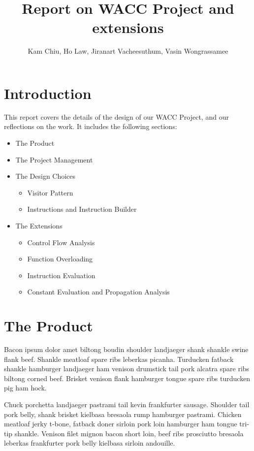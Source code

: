 \documentclass[11pt]{article}
\begin{document}
\title{Report on WACC Project and extensions}
\author{Kam Chiu, Ho Law, Jiranart Vacheesuthum, Vasin Wongrassamee}

\maketitle

\section{Introduction}

This report covers the details of the design of our WACC Project, and our reflections on the work. It includes the following sections:

\begin{itemize}
  \item The Product
  \item The Project Management
  \item The Design Choices
  \begin{itemize}
    \item Visitor Pattern
    \item Instructions and Instruction Builder
  \end{itemize}
  \item The Extensions
  \begin{itemize}
    \item Control Flow Analysis
    \item Function Overloading
    \item Instruction Evaluation
    \item Constant Evaluation and Propagation Analysis
  \end{itemize}
\end{itemize}

\section{The Product}

Bacon ipsum dolor amet biltong boudin shoulder landjaeger shank shankle swine flank beef. Shankle meatloaf spare ribs leberkas picanha. Turducken fatback shankle hamburger landjaeger ham venison drumstick tail pork alcatra spare ribs biltong corned beef. Brisket venison flank hamburger tongue spare ribs turducken pig ham hock.

\medskip

Chuck porchetta landjaeger pastrami tail kevin frankfurter sausage. Shoulder tail pork belly, shank brisket kielbasa bresaola rump hamburger pastrami. Chicken meatloaf jerky t-bone, fatback doner sirloin pork loin hamburger ham tongue tri-tip shankle. Venison filet mignon bacon short loin, beef ribs prosciutto bresaola leberkas frankfurter pork belly kielbasa sirloin andouille.
\end{document}

